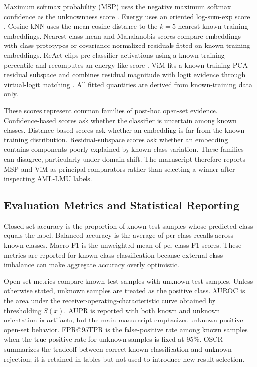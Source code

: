 Maximum softmax probability (MSP) uses the negative maximum softmax confidence as the unknownness score \cite{hendrycks2017_msp}. Energy uses an oriented log-sum-exp score \cite{liu2020_energy}. Cosine kNN uses the mean cosine distance to the $k=5$ nearest known-training embeddings. Nearest-class-mean and Mahalanobis scores compare embeddings with class prototypes or covariance-normalized residuals fitted on known-training embeddings. ReAct clips pre-classifier activations using a known-training percentile and recomputes an energy-like score \cite{sun2021_react}. ViM fits a known-training PCA residual subspace and combines residual magnitude with logit evidence through virtual-logit matching \cite{wang2022_vim}. All fitted quantities are derived from known-training data only.

These scores represent common families of post-hoc open-set evidence. Confidence-based scores ask whether the classifier is uncertain among known classes. Distance-based scores ask whether an embedding is far from the known training distribution. Residual-subspace scores ask whether an embedding contains components poorly explained by known-class variation. These families can disagree, particularly under domain shift. The manuscript therefore reports MSP and ViM as principal comparators rather than selecting a winner after inspecting AML-LMU labels.

\subsection{Evaluation Metrics and Statistical Reporting}

Closed-set accuracy is the proportion of known-test samples whose predicted class equals the label. Balanced accuracy is the average of per-class recalls across known classes. Macro-F1 is the unweighted mean of per-class F1 scores. These metrics are reported for known-class classification because external class imbalance can make aggregate accuracy overly optimistic.

Open-set metrics compare known-test samples with unknown-test samples. Unless otherwise stated, unknown samples are treated as the positive class. AUROC is the area under the receiver-operating-characteristic curve obtained by thresholding $S(x)$. AUPR is reported with both known and unknown orientation in artifacts, but the main manuscript emphasizes unknown-positive open-set behavior. FPR@95TPR is the false-positive rate among known samples when the true-positive rate for unknown samples is fixed at 95\%. OSCR summarizes the tradeoff between correct known classification and unknown rejection; it is retained in tables but not used to introduce new result selection.

